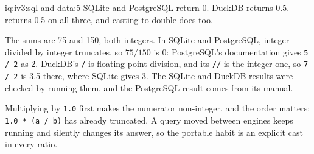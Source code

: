 \begin{solution}{iq:iv3:sql-and-data:5}
SQLite and PostgreSQL return 0. DuckDB returns 0.5.  returns 0.5 on all three, and casting to double does too.
\label{lst:iv3:sq:ratiofixed}

The sums are 75 and 150, both integers. In SQLite and PostgreSQL, integer divided by integer truncates, so $75 / 150$ is 0: PostgreSQL's documentation gives \texttt{5 / 2} as 2. DuckDB's \texttt{/} is floating-point division, and its \texttt{//} is the integer one, so \texttt{7 / 2} is 3.5 there, where SQLite gives 3. The SQLite and DuckDB results were checked by running them, and the PostgreSQL result comes from its manual.

Multiplying by \texttt{1.0} first makes the numerator non-integer, and the order matters: \texttt{1.0 * (a / b)} has already truncated. A query moved between engines keeps running and silently changes its answer, so the portable habit is an explicit cast in every ratio.

\end{solution}

